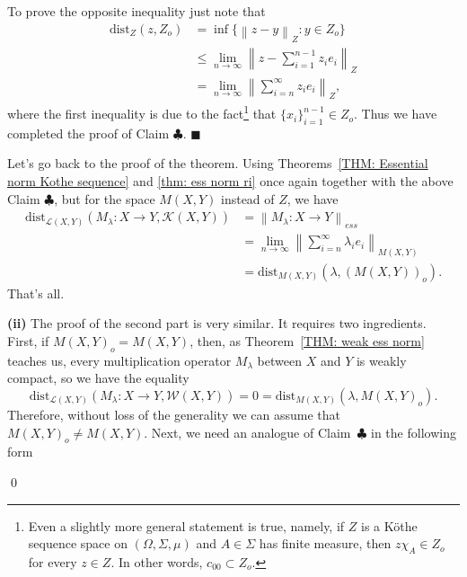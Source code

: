 \documentclass[11pt]{amsart}
\theoremstyle{definition}
\theoremstyle{definition}
\theoremstyle{definition}
\theoremstyle{definition}
\theoremstyle{definition}
\theoremstyle{definition}
\theoremstyle{definition}
\theoremstyle{definition}
\numberwithin{equation}{section}
\numberwithin{equation}{section}
\numberwithin{equation}{section}
\theoremstyle{definition}
\theoremstyle{definition}
\theoremstyle{definition}
\theoremstyle{definition}
\theoremstyle{definition}
\theoremstyle{definition}
\newcommand{\norm}[1]{\left\lVert#1\right\rVert}
\renewenvironment{proof}{\noindent {\bf Proof.}}{\qed}
\begin{document}
\begin{proof}
		To prove the opposite inequality just note that
		\begin{align*}
			\text{dist}_Z(z,Z_o)
				& = \inf\{\norm{z - y}_Z \colon y \in Z_o\} \\
				& \leqslant \lim\limits_{n \rightarrow \infty} \norm{z - \sum_{i=1}^{n-1} z_i e_i }_Z \\
				& = \lim\limits_{n \rightarrow \infty} \norm{ \sum_{i=n}^{\infty} z_i e_i }_Z,
		\end{align*}
		where the first inequality is due to the fact\footnote{Even a slightly more general statement is true, namely, if $Z$ is a K{\" o}the sequence space
		on $(\Omega,\Sigma,\mu)$ and $A \in \Sigma$ has finite measure, then $z\chi_{A} \in Z_o$ for every $z \in Z$. In other words, $c_{00} \subset Z_o$.}
		that $\{ x_i \}_{i=1}^{n-1} \in Z_o$. Thus we have completed the proof of Claim $\clubsuit$.
	\hfill $\blacksquare$
	\vspace{5pt}
	\noindent
	
	Let's go back to the proof of the theorem. Using Theorems~\ref{THM: Essential norm Kothe sequence} and \ref{thm: ess norm ri}
	once again together with the above Claim $\clubsuit$, but for the space  $M(X,Y)$ instead of $Z$, we have
	\begin{align*}
		\text{dist}_{\mathscr{L}(X,Y)}({M_{\lambda} \colon X \rightarrow Y, {\mathscr K}(X,Y)}) & = \norm{M_{\lambda} \colon X \rightarrow Y}_{ess} \\
		& = \lim\limits_{n \rightarrow \infty} \norm{ \sum_{i=n}^{\infty} \lambda_i e_i }_{M(X,Y)} \\
		& = \text{dist}_{M(X,Y)}({\lambda,(M(X,Y))_o}).
	\end{align*}
	That's all.
	
	{\bf (ii)} The proof of the second part is very similar. It requires two ingredients. First, if $M(X,Y)_o = M(X,Y)$,
	then, as Theorem~\ref{THM: weak ess norm} teaches us, every multiplication operator $M_{\lambda}$ between $X$ and $Y$ is weakly compact,
	so we have the equality
	\begin{equation*}
		\text{dist}_{\mathscr{L}(X,Y)}(M_{\lambda} \colon X \rightarrow Y, {\mathscr W}(X,Y)) = 0 = \text{dist}_{M(X,Y)}(\lambda, M(X,Y)_o).
	\end{equation*}
	Therefore, without loss of the generality we can assume that $M(X,Y)_o \neq M(X,Y)$. Next, we need an analogue of Claim~$\clubsuit$
	in the following form
	

\end{proof}
\end{document}
